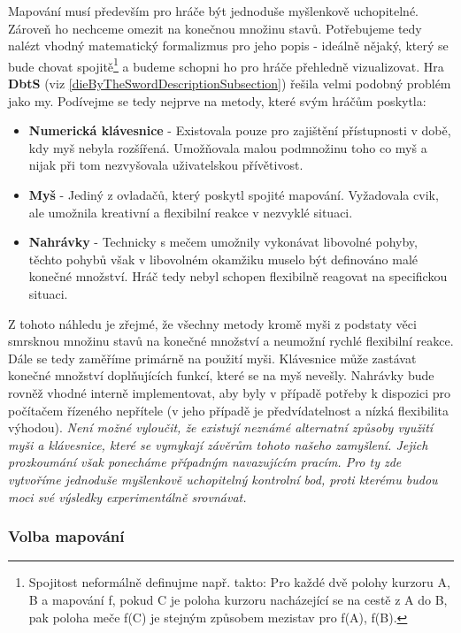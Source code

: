 Mapování musí především pro hráče být jednoduše myšlenkově uchopitelné. Zároveň ho nechceme omezit na konečnou množinu stavů. Potřebujeme tedy nalézt vhodný matematický formalizmus pro jeho popis - ideálně nějaký, který se bude chovat spojitě\footnote{Spojitost neformálně definujme např. takto: Pro každé dvě polohy kurzoru A, B a mapování f, pokud C je poloha kurzoru nacházející se na cestě z A do B, pak poloha meče f(C) je stejným způsobem mezistav pro f(A), f(B).} a budeme schopni ho pro hráče přehledně vizualizovat. 
\bigbreak
Hra \textbf{\acl{DbtS}} (viz \ref{dieByTheSwordDescriptionSubsection}) řešila velmi podobný problém jako my. Podívejme se tedy nejprve na metody, které svým hráčům poskytla:
\begin{itemize}
    \item \textbf{Numerická klávesnice} - Existovala pouze pro zajištění přístupnosti v době, kdy myš nebyla rozšířená. Umožňovala malou podmnožinu toho co myš a nijak při tom nezvyšovala uživatelskou přívětivost.
    \item \textbf{Myš} - Jediný z ovladačů, který poskytl spojité mapování. Vyžadovala cvik, ale umožnila kreativní a flexibilní reakce v nezvyklé situaci.
    \item \textbf{Nahrávky} - Technicky s mečem umožnily vykonávat libovolné pohyby, těchto pohybů však v libovolném okamžiku muselo být definováno malé konečné množství. Hráč tedy nebyl schopen flexibilně reagovat na specifickou situaci. 
\end{itemize}
Z tohoto náhledu je zřejmé, že všechny metody kromě myši z podstaty věci smrsknou množinu stavů na konečné množství a neumožní rychlé flexibilní reakce. Dále se tedy zaměříme primárně na použití myši. Klávesnice může zastávat konečné množství doplňujících funkcí, které se na myš nevešly. Nahrávky bude rovněž vhodné interně implementovat, aby byly v případě potřeby k dispozici pro počítačem řízeného nepřítele (v jeho případě je předvídatelnost a nízká flexibilita výhodou).
\bigbreak
\textit{Není možné vyloučit, že existují neznámé alternatní způsoby využití myši a klávesnice, které se vymykají závěrům tohoto našeho zamyšlení. Jejich prozkoumání však ponecháme případným navazujícím pracím. Pro ty zde vytvoříme jednoduše myšlenkově uchopitelný kontrolní bod, proti kterému budou moci své výsledky experimentálně srovnávat.}

\subsubsection*{Volba mapování}

